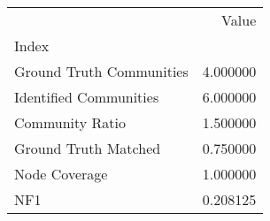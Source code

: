 \begin{tabular}{lr}
\toprule
{} &     Value \\
Index                    &           \\
\midrule
Ground Truth Communities &  4.000000 \\
Identified Communities   &  6.000000 \\
Community Ratio          &  1.500000 \\
Ground Truth Matched     &  0.750000 \\
Node Coverage            &  1.000000 \\
NF1                      &  0.208125 \\
\bottomrule
\end{tabular}
